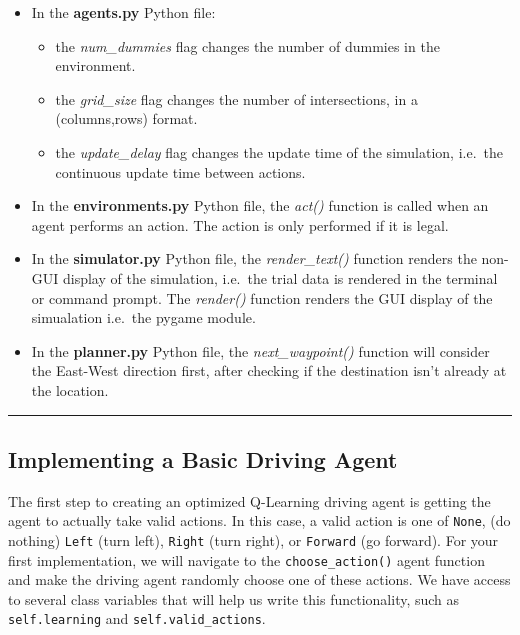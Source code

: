 \documentclass[11pt]{article}
\providecommand{\tightlist}{%
      \setlength{\itemsep}{0pt}\setlength{\parskip}{0pt}}
\begin{document}
    \begin{itemize}
\tightlist
\item
  In the \textbf{agents.py} Python file:

  \begin{itemize}
  \tightlist
  \item
    the \emph{num\_dummies} flag changes the number of dummies in the
    environment.
  \item
    the \emph{grid\_size} flag changes the number of intersections, in a
    (columns,rows) format.
  \item
    the \emph{update\_delay} flag changes the update time of the
    simulation, i.e.~the continuous update time between actions.
  \end{itemize}
\item
  In the \textbf{environments.py} Python file, the \emph{act()} function
  is called when an agent performs an action. The action is only
  performed if it is legal.
\item
  In the \textbf{simulator.py} Python file, the \emph{render\_text()}
  function renders the non-GUI display of the simulation, i.e.~the trial
  data is rendered in the terminal or command prompt. The
  \emph{render()} function renders the GUI display of the simualation
  i.e.~the pygame module.
\item
  In the \textbf{planner.py} Python file, the \emph{next\_waypoint()}
  function will consider the East-West direction first, after checking
  if the destination isn't already at the location.
\end{itemize}

    \begin{center}\rule{0.5\linewidth}{\linethickness}\end{center}

\hypertarget{implementing-a-basic-driving-agent}{%
\subsection{Implementing a Basic Driving
Agent}\label{implementing-a-basic-driving-agent}}

The first step to creating an optimized Q-Learning driving agent is
getting the agent to actually take valid actions. In this case, a valid
action is one of \texttt{None}, (do nothing)
\texttt{\textquotesingle{}Left\textquotesingle{}} (turn left),
\texttt{\textquotesingle{}Right\textquotesingle{}} (turn right), or
\texttt{\textquotesingle{}Forward\textquotesingle{}} (go forward). For
your first implementation, we will navigate to the
\texttt{\textquotesingle{}choose\_action()\textquotesingle{}} agent
function and make the driving agent randomly choose one of these
actions. We have access to several class variables that will help us
write this functionality, such as
\texttt{\textquotesingle{}self.learning\textquotesingle{}} and
\texttt{\textquotesingle{}self.valid\_actions\textquotesingle{}}.
\end{document}

